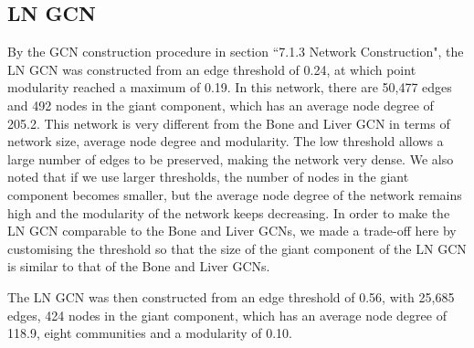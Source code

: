 \documentclass[12pt,a4paper]{report}
\begin{document}
\subsection{LN GCN}
By the GCN construction procedure in section ``7.1.3 Network Construction", the LN GCN was constructed from an edge threshold of 0.24, at which point modularity reached a maximum of 0.19. In this network, there are 50,477 edges and 492 nodes in the giant component, which has an average node degree of 205.2.  This network is very different from the Bone and Liver GCN in terms of network size, average node degree and modularity. The low threshold allows a large number of edges to be preserved, making the network very dense. We also noted that if we use larger thresholds, the number of nodes in the giant component becomes smaller, but the average node degree of the network remains high and the modularity of the network keeps decreasing. In order to make the LN GCN comparable to the Bone and Liver GCNs, we made a trade-off here by customising the threshold so that the size of the giant component of the LN GCN is similar to that of the Bone and Liver GCNs. 

The LN GCN was then constructed from an edge threshold of 0.56, with 25,685 edges, 424 nodes in the giant component, which has an average node degree of 118.9, eight communities and a modularity of 0.10.
\end{document}
